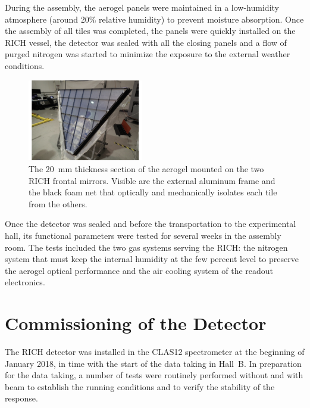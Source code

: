 \documentclass[5p,times,twocolumn]{elsarticle}
\begin{document}
During the assembly, the aerogel panels were maintained in a low-humidity atmosphere (around 20\% relative humidity)
to prevent moisture absorption. Once the assembly of all tiles was completed, the panels were quickly installed on
the RICH vessel, the detector was sealed with all the closing panels and a flow of purged nitrogen was started to
minimize the exposure to the external weather conditions.

\begin{figure}
\begin{center}
\includegraphics[width=0.45\textwidth]{aerogel_bottom.pdf}
\caption{The 20~mm thickness section of the aerogel mounted on the two RICH frontal mirrors. Visible are the
  external aluminum frame and the black foam net that optically and mechanically isolates each tile from the others.}
\label{Fig:AeroB1}
\end{center}
\end{figure}

Once the detector was sealed and before the transportation to the experimental hall, its functional parameters were
tested for several weeks in the assembly room. The tests included the two gas systems serving the RICH: the nitrogen
system that must keep the internal humidity at the few percent level to preserve the aerogel optical performance and
the air cooling system of the readout electronics.

\section{Commissioning of the Detector}
\label{sec:Commissioning}

The RICH detector was installed in the CLAS12 spectrometer at the beginning of January 2018, in time with the start
of the data taking in Hall~B. In preparation for the data taking, a number of tests were routinely performed without
and with beam to establish the running conditions and to verify the stability of the response.
\end{document}
